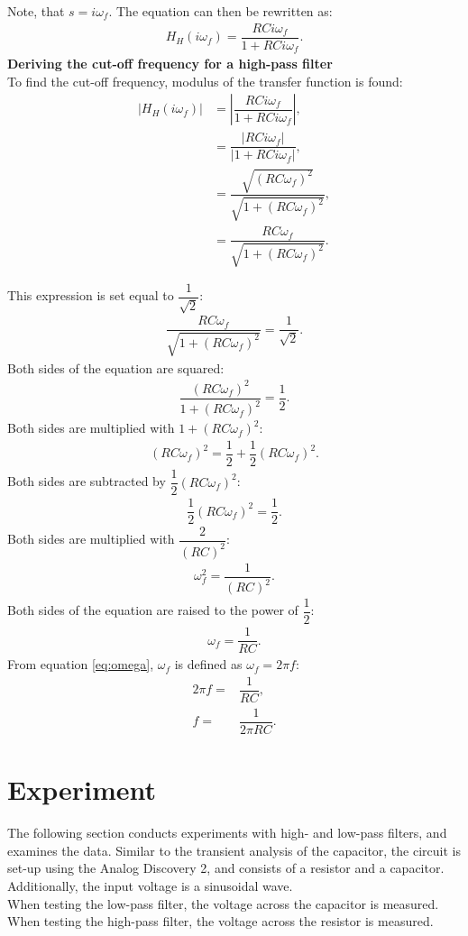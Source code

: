 Note, that $s=i\omega_f$. The equation can then be rewritten as:
\begin{align*}
H_{H}(i \omega_f) = \dfrac{RCi \omega_f}{1 + RCi \omega_f}.
\end{align*}
\textbf{Deriving the cut-off frequency for a high-pass filter} \\
To find the cut-off frequency, modulus of the transfer function is found:
\begin{align}
\left|H_{H}(i \omega_f)\right| &= \left|\dfrac{RCi \omega_f}{1 + RCi \omega_f} \right|, \nonumber \\
 &= \dfrac{|RCi \omega_f|}{|1 + RCi \omega_f |}, \nonumber \\
 &= \dfrac{\sqrt{(RC \omega_f)^2}}{\sqrt{1 + (RC \omega_f)^2 }}, \nonumber \\
 &= \dfrac{RC \omega_f}{\sqrt{1 + (RC \omega_f)^2 }}. \label{tfmodhp}
\end{align} 

\noindent This expression is set equal to $\dfrac{1}{\sqrt{2}}$:
\begin{align*}
\dfrac{RC \omega_f}{\sqrt{1 + (RC \omega_f)^2 }}=\dfrac{1}{\sqrt{2}}.
\end{align*}
Both sides of the equation are squared:
\begin{align*}
\dfrac{(RC \omega_f)^2}{1 + (RC \omega_f)^2 }=\dfrac{1}{2}.
\end{align*}
Both sides are multiplied with $1+(RC\omega_f)^2$:
\begin{align*}
(RC \omega_f)^2 =\dfrac{1}{2}+\dfrac{1}{2}(RC\omega_f)^2.
\end{align*}
Both sides are subtracted  by $\dfrac{1}{2}(RC\omega_f)^2$:
\begin{align*}
\dfrac{1}{2}(RC \omega_f)^2 =\dfrac{1}{2}.
\end{align*}
Both sides are multiplied with $\dfrac{2}{(RC)^2}$:
\begin{align*}
\omega_f^2 =\dfrac{1}{(RC)^2}.
\end{align*}
Both sides of the equation are raised to the power of $\dfrac{1}{2}$:
\begin{align*}
\omega_f =\dfrac{1}{RC}.
\end{align*}
From equation \eqref{eq:omega}, $\omega_f$ is defined as $\omega_f=2 \pi f$:
\begin{align*}
2\pi f=&\dfrac{1}{RC},
\\
f=&\dfrac{1}{2\pi RC}.
\end{align*}

\section{Experiment} \label{experiment}
The following section conducts experiments with high- and low-pass filters, and examines the data. Similar to the transient analysis of the capacitor, the circuit is set-up using the Analog Discovery 2, and consists of a resistor and a capacitor. Additionally, the input voltage  is a  sinusoidal wave. \\
When testing the low-pass filter, the voltage across the capacitor is measured. When testing the high-pass filter, the voltage across the resistor is measured.

